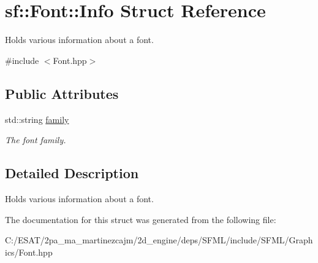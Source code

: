 \hypertarget{structsf_1_1_font_1_1_info}{}\section{sf\+:\+:Font\+:\+:Info Struct Reference}
\label{structsf_1_1_font_1_1_info}


Holds various information about a font.  




{\ttfamily \#include $<$Font.\+hpp$>$}

\subsection*{Public Attributes}
\begin{DoxyCompactItemize}
\item 
\mbox{\label{structsf_1_1_font_1_1_info_a008413b4b6cf621eb92668a11098a519}} 
std\+::string \hyperlink{structsf_1_1_font_1_1_info_a008413b4b6cf621eb92668a11098a519}{family}
\begin{DoxyCompactList}\small\item\em The font family. \end{DoxyCompactList}\end{DoxyCompactItemize}


\subsection{Detailed Description}
Holds various information about a font. 

The documentation for this struct was generated from the following file\+:\begin{DoxyCompactItemize}
\item 
C\+:/\+E\+S\+A\+T/2pa\+\_\+ma\+\_\+martinezcajm/2d\+\_\+engine/deps/\+S\+F\+M\+L/include/\+S\+F\+M\+L/\+Graphics/Font.\+hpp\end{DoxyCompactItemize}
